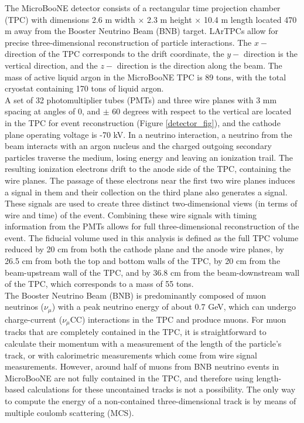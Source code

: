 \documentclass[a4paper,11pt]{article}
\begin{document}
The MicroBooNE detector\cite{ub_detectorpaper} consists of a rectangular time projection chamber (TPC) with dimensions 2.6 m width $\times$ 2.3 m height $\times$ 10.4 m length located 470 m away from the Booster Neutrino Beam (BNB) target. LArTPCs allow for precise three-dimensional reconstruction of particle interactions. The $x-$ direction of the TPC corresponds to the drift coordinate, the $y-$ direction is the vertical direction, and the $z-$ direction is the direction along the beam. The mass of active liquid argon in the MicroBooNE TPC is 89 tons, with the total cryostat containing 170 tons of liquid argon.\\

A set of 32 photomultiplier tubes (PMTs) and three wire planes with 3 mm spacing at angles of 0, and $\pm$ 60 degrees with respect to the vertical are located in the TPC for event reconstruction (Figure \ref{detector_fig}), and the cathode plane operating voltage is -70 kV. In a neutrino interaction, a neutrino from the beam interacts with an argon nucleus and the charged outgoing secondary particles traverse the medium, losing energy and leaving an ionization trail. The resulting ionization electrons drift to the anode side of the TPC, containing the wire planes. The passage of these electrons near the first two wire planes induces a signal in them and their collection on the third plane also generates a signal. These signals are used to create three distinct two-dimensional views (in terms of wire and time) of the event. Combining these wire signals with timing information from the PMTs allows for full three-dimensional reconstruction of the event. The fiducial volume used in this analysis is defined as the full TPC volume reduced by 20 cm from both the cathode plane and the anode wire planes, by 26.5 cm from both the top and bottom walls of the TPC, by 20 cm from the beam-upstream wall of the TPC, and by 36.8 cm from the beam-downstream wall of the TPC, which corresponds to a mass of 55 tons.\\

The Booster Neutrino Beam (BNB) is predominantly composed of muon neutrinos ($\nu_\mu$) with a peak neutrino energy of about 0.7 GeV, which can undergo charge-current ($\nu_\mu$CC) interactions in the TPC and produce muons. For muon tracks that are completely contained in the TPC, it is straightforward to calculate their momentum with a measurement of the length of the particle's track, or with calorimetric measurements which come from wire signal measurements. However, around half of muons from BNB neutrino events in MicroBooNE are not fully contained in the TPC, and therefore using length-based calculations for these uncontained tracks is not a possibility. The only way to compute the energy of a non-contained three-dimensional track is by means of multiple coulomb scattering (MCS). \\
\end{document}

